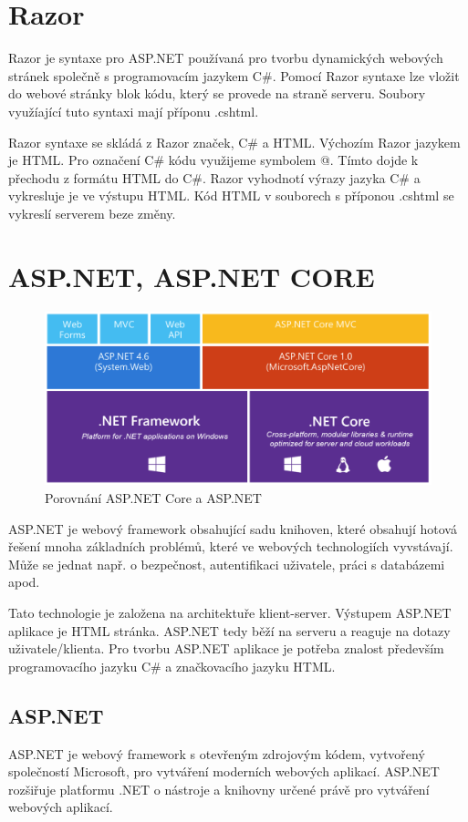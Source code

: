 \documentclass[a4paper, 12pt]{report}
\begin{document}
		\section{Razor}
		Razor je syntaxe pro ASP.NET používaná pro tvorbu dynamických webových stránek společně s programovacím jazykem C\#. Pomocí Razor syntaxe lze vložit do webové stránky blok kódu, který se provede na straně serveru. Soubory využíající tuto syntaxi mají příponu .cshtml.\par
		Razor syntaxe se skládá z Razor značek, C\# a HTML. Výchozím Razor jazykem je HTML. Pro označení C\# kódu využijeme symbolem @. Tímto dojde k přechodu z formátu HTML do C\#. Razor vyhodnotí výrazy jazyka C\# a vykresluje je ve výstupu HTML. Kód HTML v souborech s příponou .cshtml se vykreslí serverem beze změny.\cite{Razor}
		\section{ASP.NET, ASP.NET CORE}
			\begin{figure}[h!]
				\includegraphics[width=\textwidth]{aspnetcore_aspnet}
				\caption{Porovnání ASP.NET Core a ASP.NET \cite{ASPNETCORE_ASPNET}}
				\label{ASP.NET Core a ASP.NET}
			\end{figure}
			ASP.NET je webový framework obsahující sadu knihoven, které obsahují hotová řešení mnoha základních problémů, které ve webových technologiích vyvstávají. Může se jednat např. o bezpečnost, autentifikaci uživatele, práci s databázemi apod.\par
			Tato technologie je založena na architektuře klient-server. Výstupem ASP.NET aplikace je HTML stránka. ASP.NET tedy běží na serveru a reaguje na dotazy uživatele/klienta. Pro tvorbu ASP.NET aplikace je potřeba znalost především programovacího jazyku C\# a značkovacího jazyku HTML.\cite{ASP.NET_Lekce1}
			\subsection{ASP.NET}
            ASP.NET je webový framework s otevřeným zdrojovým kódem, vytvořený společností Microsoft, pro vytváření moderních webových aplikací. ASP.NET rozšiřuje platformu .NET o nástroje a knihovny určené právě pro vytváření webových aplikací.\cite{ASP.NET}
\end{document}
